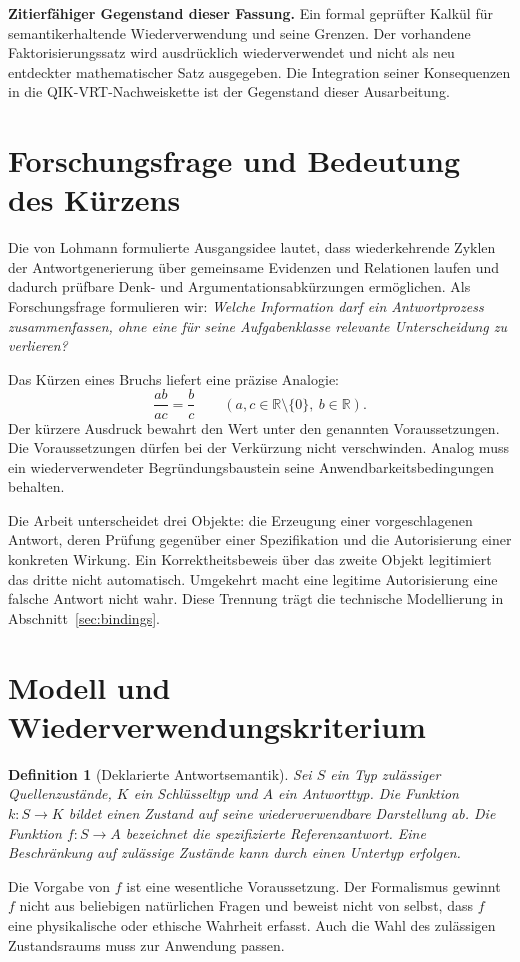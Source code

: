 \documentclass[11pt,a4paper]{article}
\newtheorem{definition}{Definition}
\begin{document}
\textbf{Zitierfähiger Gegenstand dieser Fassung.} Ein formal geprüfter Kalkül für
semantikerhaltende Wiederverwendung und seine Grenzen. Der vorhandene
Faktorisierungssatz wird ausdrücklich wiederverwendet und nicht als neu entdeckter
mathematischer Satz ausgegeben. Die Integration seiner Konsequenzen in die
QIK-VRT-Nachweiskette ist der Gegenstand dieser Ausarbeitung.
\newpage

\section{Forschungsfrage und Bedeutung des Kürzens}
Die von Lohmann formulierte Ausgangsidee lautet, dass wiederkehrende Zyklen der
Antwortgenerierung über gemeinsame Evidenzen und Relationen laufen und dadurch
prüfbare Denk- und Argumentationsabkürzungen ermöglichen. Als Forschungsfrage
formulieren wir: \emph{Welche Information darf ein Antwortprozess zusammenfassen,
ohne eine für seine Aufgabenklasse relevante Unterscheidung zu verlieren?}

Das Kürzen eines Bruchs liefert eine präzise Analogie:
\[
 \frac{ab}{ac}=\frac bc\qquad(a,c\in\mathbb R\setminus\{0\},\ b\in\mathbb R).
\]
Der kürzere Ausdruck bewahrt den Wert unter den genannten Voraussetzungen. Die
Voraussetzungen dürfen bei der Verkürzung nicht verschwinden. Analog muss ein
wiederverwendeter Begründungsbaustein seine Anwendbarkeitsbedingungen behalten.

Die Arbeit unterscheidet drei Objekte: die Erzeugung einer vorgeschlagenen Antwort,
deren Prüfung gegenüber einer Spezifikation und die Autorisierung einer konkreten
Wirkung. Ein Korrektheitsbeweis über das zweite Objekt legitimiert das dritte nicht
automatisch. Umgekehrt macht eine legitime Autorisierung eine falsche Antwort nicht
wahr. Diese Trennung trägt die technische Modellierung in Abschnitt~\ref{sec:bindings}.

\section{Modell und Wiederverwendungskriterium}
\begin{definition}[Deklarierte Antwortsemantik]
Sei $S$ ein Typ zulässiger Quellenzustände, $K$ ein Schlüsseltyp und $A$ ein
Antworttyp. Die Funktion $k:S\to K$ bildet einen Zustand auf seine wiederverwendbare
Darstellung ab. Die Funktion $f:S\to A$ bezeichnet die spezifizierte Referenzantwort.
Eine Beschränkung auf zulässige Zustände kann durch einen Untertyp erfolgen.
\end{definition}
Die Vorgabe von $f$ ist eine wesentliche Voraussetzung. Der Formalismus gewinnt
$f$ nicht aus beliebigen natürlichen Fragen und beweist nicht von selbst, dass
$f$ eine physikalische oder ethische Wahrheit erfasst. Auch die Wahl des zulässigen
Zustandsraums muss zur Anwendung passen.
\end{document}

